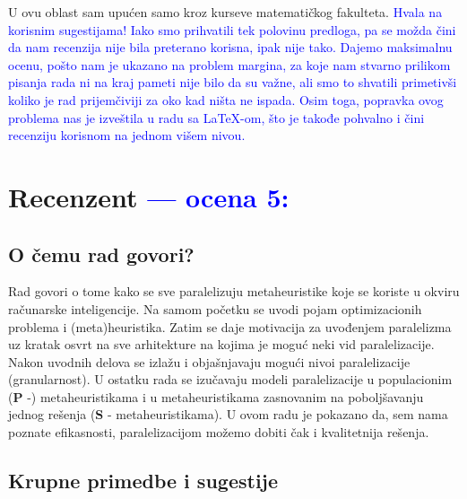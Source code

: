 \documentclass[a4paper]{report}
\newcommand{\odgovor}[1]{\textcolor{blue}{#1}}
\begin{document}
U ovu oblast sam upućen samo kroz kurseve matematičkog fakulteta. \odgovor{Hvala na korisnim sugestijama! Iako smo prihvatili tek polovinu predloga, pa se možda čini da nam recenzija nije bila preterano korisna, ipak nije tako. Dajemo maksimalnu ocenu, pošto nam je ukazano na problem margina, za koje nam stvarno prilikom pisanja rada ni na kraj pameti nije bilo da su važne, ali smo to shvatili primetivši koliko je rad prijemčiviji za oko kad ništa ne ispada. Osim toga, popravka ovog problema nas je izveštila u radu sa LaTeX-om, što je takođe pohvalno i čini recenziju korisnom na jednom višem nivou.}


\chapter{Recenzent \odgovor{--- ocena 5:} }


\section{O čemu rad govori?}
Rad govori o tome kako se sve paralelizuju metaheuristike koje se koriste u okviru računarske inteligencije. Na samom početku se uvodi pojam optimizacionih problema i (meta)heuristika. Zatim se daje motivacija za uvođenjem paralelizma uz kratak osvrt na sve arhitekture na kojima je moguć neki vid paralelizacije. Nakon uvodnih delova se izlažu i objašnjavaju mogući nivoi paralelizacije (granularnost). U ostatku rada se izučavaju modeli paralelizacije u populacionim (\textbf{P} -) metaheuristikama i u metaheuristikama zasnovanim na poboljšavanju jednog rešenja (\textbf{S} - metaheuristikama). U ovom radu je pokazano da, sem nama poznate efikasnosti, paralelizacijom možemo dobiti čak i kvalitetnija rešenja.

\section{Krupne primedbe i sugestije}
\end{document}
